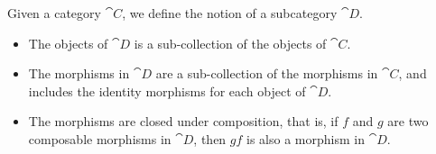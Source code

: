 \vspace*{0.3in}

\begin{definition}
Given a category $\cat{C}$, we define the notion of a subcategory $\cat{D}$.
\begin{itemize}
\item The objects of $\cat{D}$ is a sub-collection of the objects of $\cat{C}$.
\item The morphisms in $\cat{D}$ are a sub-collection of the morphisms in $\cat{C}$, and includes the identity morphisms for each object of $\cat{D}$.
\item The morphisms are closed under composition, that is, if $f$ and $g$ are two composable morphisms in $\cat{D}$, then $gf$ is also a morphism in $\cat{D}$.
\end{itemize}
\end{definition}

\vspace{0.1in}

